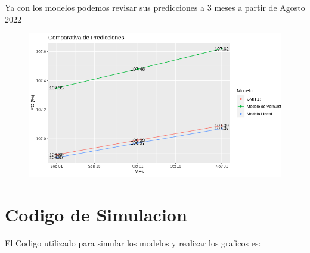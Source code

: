 \documentclass[a4paper,10pt]{article}
\begin{document}
Ya con los modelos podemos revisar sus predicciones a 3 meses a partir de Agosto 2022

\begin{figure}[htb!]
 \centering
 \includegraphics[width=\textwidth]{../images/pred.png}
\end{figure}

\section{Codigo de Simulacion}
El Codigo utilizado para simular los modelos y realizar los graficos es:
\end{document}
